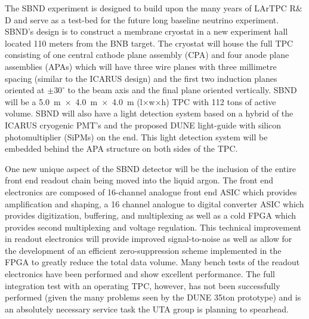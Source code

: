 \label{sec:IF_SBND}
The SBND experiment is designed to build upon the many years of LArTPC R$\&$D and serve as a test-bed for the future long baseline neutrino experiment. SBND's design is to construct a membrane cryostat in a new experiment hall located 110 meters from the BNB target. The cryostat will house the full TPC consisting of one central cathode plane assembly (CPA) and four anode plane assemblies (APAs) which will have three wire planes with three millimetre spacing (similar to the ICARUS design) and the first two induction planes oriented at $\pm 30^{\circ}$ to the beam axis and the final plane oriented vertically. SBND will be a 5.0~m~$\times$~4.0~m~$\times$~4.0~m (l$\times$w$\times$h) TPC with 112 tons of active volume. SBND will also have a light detection system based on a hybrid of the ICARUS cryogenic PMT's and the proposed DUNE light-guide with silicon photomultiplier (SiPMs) on the end. This light detection system will be embedded behind the APA structure on both sides of the TPC. 


One new unique aspect of the SBND detector will be the inclusion of the entire front end readout chain being moved into the liquid argon. The front end electronics are composed of 16-channel analogue front end ASIC which provides amplification and shaping, a 16 channel analogue to digital converter ASIC which provides digitization, buffering, and multiplexing as well as a cold FPGA which provides second multiplexing and voltage regulation. This technical improvement in readout electronics will provide improved signal-to-noise as well as allow for the development of an efficient zero-suppression scheme implemented in the FPGA to greatly reduce the total data volume. Many bench tests of the readout electronics have been performed and show excellent performance. The full integration test with an operating TPC, however, has not been successfully performed (given the many problems seen by the DUNE 35ton prototype) and is an absolutely necessary service task the UTA group is planning to spearhead. 


